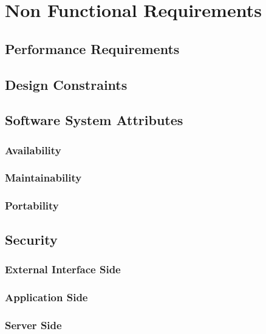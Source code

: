 \section{Non Functional Requirements}

		\subsection{Performance Requirements}

		\subsection{Design Constraints}

		\subsection{Software System Attributes}

			\subsubsection{Availability}

			\subsubsection{Maintainability}

			\subsubsection{Portability}

		\subsection{Security}

			\subsubsection{External Interface Side}

			\subsubsection{Application Side}

			\subsubsection{Server Side}